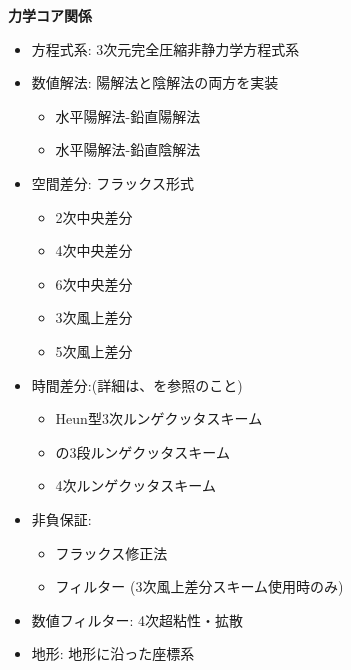 {\bf 力学コア関係}
\begin{itemize}
 \item 方程式系: 3次元完全圧縮非静力学方程式系
 \item 数値解法: 陽解法と陰解法の両方を実装
   \begin{itemize}
    \item 水平陽解法-鉛直陽解法
    \item 水平陽解法-鉛直陰解法
   \end{itemize}
 \item 空間差分: フラックス形式
    \begin{itemize}
      \item 2次中央差分
      \item 4次中央差分
      \item 6次中央差分
      \item 3次風上差分
      \item 5次風上差分
    \end{itemize}
 \item 時間差分:(詳細は、\citet{scale_2015}を参照のこと)
    \begin{itemize}
      \item Heun型3次ルンゲクッタスキーム
      \item \citet{Wicker_2002}の3段ルンゲクッタスキーム
      \item 4次ルンゲクッタスキーム
    \end{itemize}
 \item 非負保証:
    \begin{itemize}
      \item フラックス修正法 \citep[Flux Corrected Transport, FCT; ][]{zalesak_1979}\\
      \item \citet{Koren_1993}フィルター  (3次風上差分スキーム使用時のみ)
    \end{itemize}
 \item 数値フィルター: 4次超粘性・拡散
 \item 地形: 地形に沿った座標系
\end{itemize}

